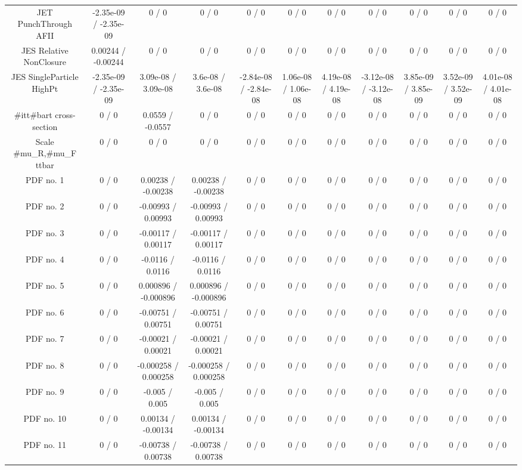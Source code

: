 \begin{table}[htbp]
\begin{center}
\begin{tabular}{|c|c|c|c|c|c|c|c|c|c|c|}
  JET PunchThrough AFII & -2.35e-09 / -2.35e-09 & 0 / 0 & 0 / 0 & 0 / 0 & 0 / 0 & 0 / 0 & 0 / 0 & 0 / 0 & 0 / 0 & 0 / 0 \\ 
  JES Relative NonClosure & 0.00244 / -0.00244 & 0 / 0 & 0 / 0 & 0 / 0 & 0 / 0 & 0 / 0 & 0 / 0 & 0 / 0 & 0 / 0 & 0 / 0 \\ 
  JES SingleParticle HighPt & -2.35e-09 / -2.35e-09 & 3.09e-08 / 3.09e-08 & 3.6e-08 / 3.6e-08 & -2.84e-08 / -2.84e-08 & 1.06e-08 / 1.06e-08 & 4.19e-08 / 4.19e-08 & -3.12e-08 / -3.12e-08 & 3.85e-09 / 3.85e-09 & 3.52e-09 / 3.52e-09 & 4.01e-08 / 4.01e-08 \\ 
  #it{t#bar{t}} cross-section & 0 / 0 & 0.0559 / -0.0557 & 0 / 0 & 0 / 0 & 0 / 0 & 0 / 0 & 0 / 0 & 0 / 0 & 0 / 0 & 0 / 0 \\ 
  Scale #mu_{R},#mu_{F} ttbar & 0 / 0 & 0 / 0 & 0 / 0 & 0 / 0 & 0 / 0 & 0 / 0 & 0 / 0 & 0 / 0 & 0 / 0 & 0 / 0 \\ 
  PDF no. 1 & 0 / 0 & 0.00238 / -0.00238 & 0.00238 / -0.00238 & 0 / 0 & 0 / 0 & 0 / 0 & 0 / 0 & 0 / 0 & 0 / 0 & 0 / 0 \\ 
  PDF no. 2 & 0 / 0 & -0.00993 / 0.00993 & -0.00993 / 0.00993 & 0 / 0 & 0 / 0 & 0 / 0 & 0 / 0 & 0 / 0 & 0 / 0 & 0 / 0 \\ 
  PDF no. 3 & 0 / 0 & -0.00117 / 0.00117 & -0.00117 / 0.00117 & 0 / 0 & 0 / 0 & 0 / 0 & 0 / 0 & 0 / 0 & 0 / 0 & 0 / 0 \\ 
  PDF no. 4 & 0 / 0 & -0.0116 / 0.0116 & -0.0116 / 0.0116 & 0 / 0 & 0 / 0 & 0 / 0 & 0 / 0 & 0 / 0 & 0 / 0 & 0 / 0 \\ 
  PDF no. 5 & 0 / 0 & 0.000896 / -0.000896 & 0.000896 / -0.000896 & 0 / 0 & 0 / 0 & 0 / 0 & 0 / 0 & 0 / 0 & 0 / 0 & 0 / 0 \\ 
  PDF no. 6 & 0 / 0 & -0.00751 / 0.00751 & -0.00751 / 0.00751 & 0 / 0 & 0 / 0 & 0 / 0 & 0 / 0 & 0 / 0 & 0 / 0 & 0 / 0 \\ 
  PDF no. 7 & 0 / 0 & -0.00021 / 0.00021 & -0.00021 / 0.00021 & 0 / 0 & 0 / 0 & 0 / 0 & 0 / 0 & 0 / 0 & 0 / 0 & 0 / 0 \\ 
  PDF no. 8 & 0 / 0 & -0.000258 / 0.000258 & -0.000258 / 0.000258 & 0 / 0 & 0 / 0 & 0 / 0 & 0 / 0 & 0 / 0 & 0 / 0 & 0 / 0 \\ 
  PDF no. 9 & 0 / 0 & -0.005 / 0.005 & -0.005 / 0.005 & 0 / 0 & 0 / 0 & 0 / 0 & 0 / 0 & 0 / 0 & 0 / 0 & 0 / 0 \\ 
  PDF no. 10 & 0 / 0 & 0.00134 / -0.00134 & 0.00134 / -0.00134 & 0 / 0 & 0 / 0 & 0 / 0 & 0 / 0 & 0 / 0 & 0 / 0 & 0 / 0 \\ 
  PDF no. 11 & 0 / 0 & -0.00738 / 0.00738 & -0.00738 / 0.00738 & 0 / 0 & 0 / 0 & 0 / 0 & 0 / 0 & 0 / 0 & 0 / 0 & 0 / 0 \\ 

\end{tabular}
\end{center}
\end{table}
